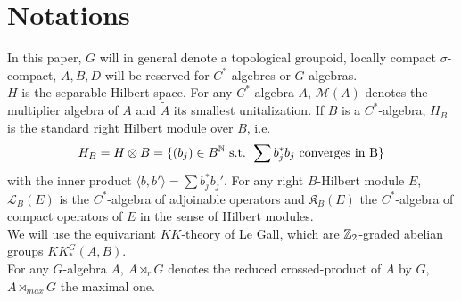 \section{Notations}

In this paper, $G$ will in general denote a topological groupoid, locally compact $\sigma$-compact, $A,B,D$ will be reserved for $C^*$-algebres or $G$-algebras.\\

$H$ is the separable Hilbert space. For any $C^*$-algebra $A$, $\mathcal M(A)$ denotes the multiplier algebra of $A$ and $\tilde A$ its smallest unitalization. If $B$ is a $C^*$-algebra, $H_B$ is the standard right Hilbert module over $B$, i.e. \[H_B= H\otimes B=\{(b_j)\in B^\mathbb N \text{ s.t. }\sum b_j^* b_j \text{ converges in B}\}\] with the inner product $\langle b, b'\rangle = \sum b_j^* b_j'$. For any right $B$-Hilbert module $E$, $\mathcal L_B(E)$ is the $C^*$-algebra of adjoinable operators and $\mathfrak K_B(E)$ the $C^*$-algebra of compact operators of $E$ in the sense of Hilbert modules.\\

We will use the equivariant $KK$-theory of Le Gall, which are $\mathbb Z_2$-graded abelian groups $KK^G_*(A,B)$.\\

For any $G$-algebra $A$, $A\rtimes_r G$ denotes the reduced crossed-product of $A$ by $G$, $A\rtimes_{max} G$ the maximal one. 

